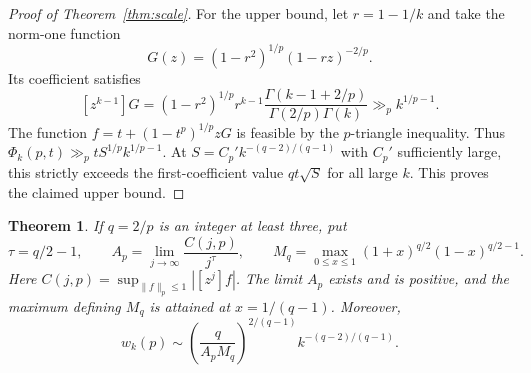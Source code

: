 \documentclass[11pt]{article}
\numberwithin{equation}{section}
\newtheorem{theorem}{Theorem}[section]
\theoremstyle{remark}
\newcommand{\norm}[1]{\lVert #1\rVert}
\newcommand{\coef}[1]{[z^{#1}]}
\begin{document}
\begin{proof}[Proof of Theorem~\ref{thm:scale}]
For the upper bound, let \(r=1-1/k\) and take the norm-one function
\[
  G(z)=(1-r^2)^{1/p}(1-rz)^{-2/p}.
\]
Its coefficient satisfies
\[
  \coef{k-1}G
      =(1-r^2)^{1/p}r^{k-1}
       \frac{\Gamma(k-1+2/p)}{\Gamma(2/p)\Gamma(k)}
      \gg_p k^{1/p-1}.
\]
The function \(f=t+(1-t^p)^{1/p}zG\) is feasible by the
\(p\)-triangle inequality. Thus
\(\Phi_k(p,t)\gg_p t S^{1/p} k^{1/p-1}\).
At \(S=C_p' k^{-(q-2)/(q-1)}\) with \(C_p'\) sufficiently large,
this strictly exceeds the first-coefficient value \(qt\sqrt S\)
for all large \(k\). This proves the claimed upper bound.
\end{proof}

\begin{theorem}\label{thm:phaseconstant}
If \(q=2/p\) is an integer at least three, put
\[
  \tau=q/2-1,\qquad
  A_p=\lim_{j\to\infty}\frac{C(j,p)}{j^\tau},\qquad
  M_q=\max_{0\le x\le1}(1+x)^{q/2}(1-x)^{q/2-1}.
\]
Here \(C(j,p)=\sup_{\norm{f}_p\le1}|\coef{j}f|\).
The limit \(A_p\) exists and is positive, and the maximum defining
\(M_q\) is attained at \(x=1/(q-1)\). Moreover,
\[
  w_k(p)\sim
   \left(\frac{q}{A_p M_q}\right)^{2/(q-1)}
       k^{-(q-2)/(q-1)} .
\]
\end{theorem}
\end{document}
